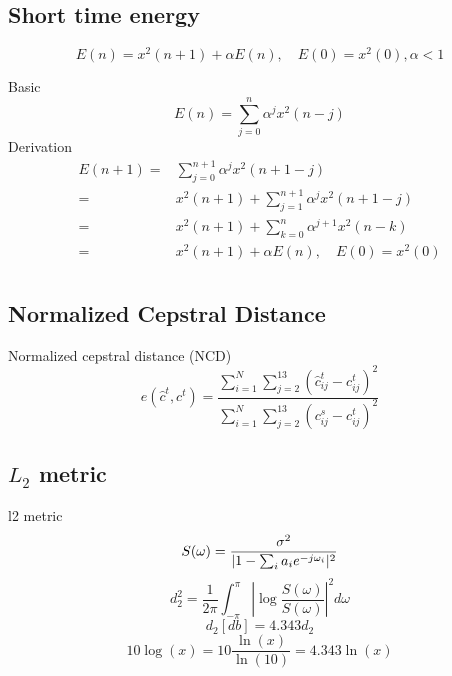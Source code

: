 \subsection{Short time energy} %
\label{sub:short_time_energy}
\begin{definition}
	\begin{equation}
		E(n) = x^2(n+1)+\alpha E(n), \quad E(0)=x^2(0),\alpha<1
	\end{equation}
\end{definition}
Basic \cite{rabiner78}
\begin{equation}
	E(n)=\sum_{j=0}^{n}\alpha^jx^2(n-j)
\end{equation}
Derivation
\begin{equation}
	\begin{split}
		E(n+1)=& \sum_{j=0}^{n+1}\alpha^jx^2(n+1-j)\\
		=& x^2(n+1)+\sum_{j=1}^{n+1}\alpha^jx^2(n+1-j)\\
		=& x^2(n+1)+\sum_{k=0}^{n}\alpha^{j+1} x^2(n-k)\\
		=& x^2(n+1)+\alpha E(n), \quad E(0)=x^2(0)\\
	\end{split}
\end{equation}

\subsection{Normalized Cepstral Distance} %
\label{sub:normalized_cepstral_distance}
\begin{definition}
	Normalized cepstral distance (NCD)
\begin{equation}
	e(\hat{c}^t,c^t) = \frac{\sum_{i=1}^{N}\sum_{j=2}^{13}(\hat{c}_{ij}^t-c_{ij}^t)^2}{\sum_{i=1}^{N}\sum_{j=2}^{13}(c_{ij}^s-c_{ij}^t)^2}
\end{equation}
\end{definition}

\subsection{$L_2$ metric} %
\label{sub:l2_metric}
l2 metric \cite{gray76}
\begin{equation}
	S(\omega) = \frac{\sigma^2}{\lvert1-\sum_{i}a_i e^{-j\omega_i}\rvert^2}
\end{equation}
\begin{equation}
	d_2^2 = \frac{1}{2\pi}\int_{-\pi}^{\pi}\left\lvert\log \frac{S(\omega)}{S(\omega)}\right\rvert^2 d\omega
\end{equation}
\begin{equation}
	d_2 [db] = 4.343 d_2
\end{equation}
\begin{equation}
	10\log(x) = 10 \frac{\ln(x)}{\ln(10)} = 4.343\ln(x) 
\end{equation}


